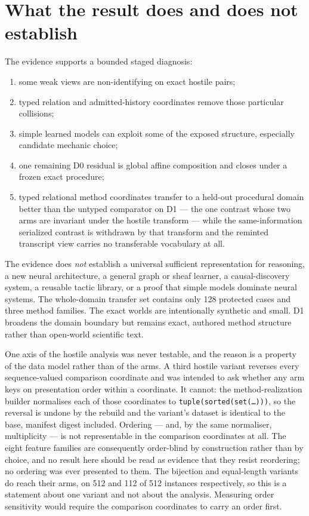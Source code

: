 \section{What the result does and does not establish}

The evidence supports a bounded staged diagnosis:
\begin{enumerate}
    \item some weak views are non-identifying on exact hostile pairs;
    \item typed relation and admitted-history coordinates remove those particular collisions;
    \item simple learned models can exploit some of the exposed structure, especially candidate mechanic choice;
    \item one remaining D0 residual is global affine composition and closes under a frozen exact procedure;
    \item typed relational method coordinates transfer to a held-out procedural domain better than the untyped comparator on D1 --- the one contrast whose two arms are invariant under the hostile transform --- while the same-information serialized contrast is withdrawn by that transform and the reminted transcript view carries no transferable vocabulary at all.
\end{enumerate}

The evidence does \emph{not} establish a universal sufficient representation for reasoning, a new neural architecture, a general graph or sheaf learner, a causal-discovery system, a reusable tactic library, or a proof that simple models dominate neural systems. The whole-domain transfer set contains only 128 protected cases and three method families. The exact worlds are intentionally synthetic and small. D1 broadens the domain boundary but remains exact, authored method structure rather than open-world scientific text.

One axis of the hostile analysis was never testable, and the reason is a property of the data model rather than of the arms. A third hostile variant reverses every sequence-valued comparison coordinate and was intended to ask whether any arm keys on presentation order within a coordinate. It cannot: the method-realization builder normalises each of those coordinates to \texttt{tuple(sorted(set(\ldots)))}, so the reversal is undone by the rebuild and the variant's dataset is identical to the base, manifest digest included. Ordering --- and, by the same normaliser, multiplicity --- is not representable in the comparison coordinates at all. The eight feature families are consequently order-blind by construction rather than by choice, and no result here should be read as evidence that they resist reordering; no ordering was ever presented to them. The bijection and equal-length variants do reach their arms, on 512 and 112 of 512 instances respectively, so this is a statement about one variant and not about the analysis. Measuring order sensitivity would require the comparison coordinates to carry an order first.

